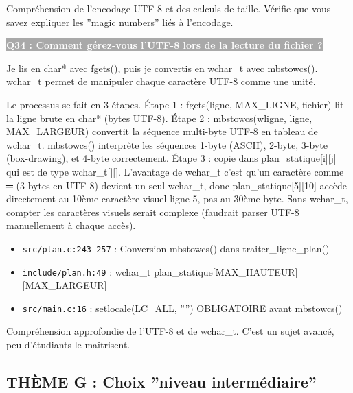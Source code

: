 \documentclass[12pt,a4paper]{article}
\newcommand{\question}[1]{%
    \vspace{0.5cm}
    \noindent\colorbox{darkgray}{\textcolor{white}{\textbf{#1}}}
    \vspace{0.3cm}
}
\begin{document}
\begin{objectif_prof}
Compréhension de l'encodage UTF-8 et des calculs de taille. Vérifie que vous savez expliquer les ''magic numbers'' liés à l'encodage.
\end{objectif_prof}

\question{Q34 : Comment gérez-vous l'UTF-8 lors de la lecture du fichier ?}

\begin{reponse_courte}
Je lis en char* avec fgets(), puis je convertis en wchar\_t avec mbstowcs(). wchar\_t permet de manipuler chaque caractère UTF-8 comme une unité.
\end{reponse_courte}

\begin{reponse_longue}
Le processus se fait en 3 étapes. Étape 1 : fgets(ligne, MAX\_LIGNE, fichier) lit la ligne brute en char* (bytes UTF-8). Étape 2 : mbstowcs(wligne, ligne, MAX\_LARGEUR) convertit la séquence multi-byte UTF-8 en tableau de wchar\_t. mbstowcs() interprète les séquences 1-byte (ASCII), 2-byte, 3-byte (box-drawing), et 4-byte correctement. Étape 3 : copie dans plan\_statique[i][j] qui est de type wchar\_t[][]. L'avantage de wchar\_t c'est qu'un caractère comme ═ (3 bytes en UTF-8) devient un seul wchar\_t, donc plan\_statique[5][10] accède directement au 10ème caractère visuel ligne 5, pas au 30ème byte. Sans wchar\_t, compter les caractères visuels serait complexe (faudrait parser UTF-8 manuellement à chaque accès).
\end{reponse_longue}

\begin{reference_code}
\begin{itemize}
    \item \texttt{src/plan.c:243-257} : Conversion mbstowcs() dans traiter\_ligne\_plan()
    \item \texttt{include/plan.h:49} : wchar\_t plan\_statique[MAX\_HAUTEUR][MAX\_LARGEUR]
    \item \texttt{src/main.c:16} : setlocale(LC\_ALL, '''') OBLIGATOIRE avant mbstowcs()
\end{itemize}
\end{reference_code}

\begin{objectif_prof}
Compréhension approfondie de l'UTF-8 et de wchar\_t. C'est un sujet avancé, peu d'étudiants le maîtrisent.
\end{objectif_prof}

\subsection{THÈME G : Choix ''niveau intermédiaire''}
\end{document}
